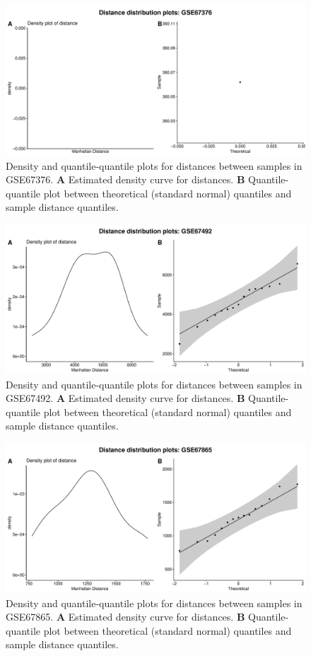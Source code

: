 \documentclass[10pt,letterpaper]{article}\usepackage[]{graphicx}\usepackage[]{color}
\begin{document}
\begin{figure}[H]
	\includegraphics[width=\textwidth]{manhattan-distance_hist_GSE67376.pdf}
	\caption{Density and quantile-quantile plots for distances between samples in GSE67376. \textbf{A} Estimated density curve for distances. \textbf{B} Quantile-quantile plot between theoretical (standard normal) quantiles and sample distance quantiles.}
\end{figure}

\begin{figure}[H]
	\includegraphics[width=\textwidth]{manhattan-distance_hist_GSE67492.pdf}
	\caption{Density and quantile-quantile plots for distances between samples in GSE67492. \textbf{A} Estimated density curve for distances. \textbf{B} Quantile-quantile plot between theoretical (standard normal) quantiles and sample distance quantiles.}
\end{figure}

\begin{figure}[H]
	\includegraphics[width=\textwidth]{manhattan-distance_hist_GSE67865.pdf}
	\caption{Density and quantile-quantile plots for distances between samples in GSE67865. \textbf{A} Estimated density curve for distances. \textbf{B} Quantile-quantile plot between theoretical (standard normal) quantiles and sample distance quantiles.}
\end{figure}
\end{document}
